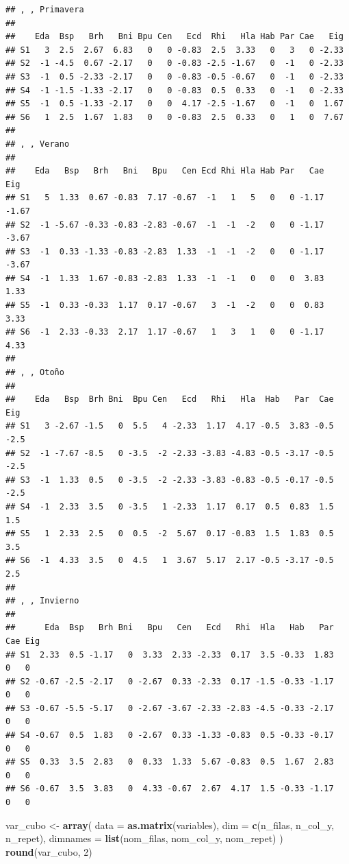 \documentclass[
  spanish,
]{article}
\newenvironment{Shaded}{\begin{snugshade}}{\end{snugshade}}
\newcommand{\DataTypeTok}[1]{\textcolor[rgb]{0.13,0.29,0.53}{#1}}
\newcommand{\DecValTok}[1]{\textcolor[rgb]{0.00,0.00,0.81}{#1}}
\newcommand{\KeywordTok}[1]{\textcolor[rgb]{0.13,0.29,0.53}{\textbf{#1}}}
\newcommand{\NormalTok}[1]{#1}
\newcommand{\StringTok}[1]{\textcolor[rgb]{0.31,0.60,0.02}{#1}}
\begin{document}
\begin{verbatim}
## , , Primavera
## 
##    Eda  Bsp   Brh   Bni Bpu Cen   Ecd  Rhi   Hla Hab Par Cae   Eig
## S1   3  2.5  2.67  6.83   0   0 -0.83  2.5  3.33   0   3   0 -2.33
## S2  -1 -4.5  0.67 -2.17   0   0 -0.83 -2.5 -1.67   0  -1   0 -2.33
## S3  -1  0.5 -2.33 -2.17   0   0 -0.83 -0.5 -0.67   0  -1   0 -2.33
## S4  -1 -1.5 -1.33 -2.17   0   0 -0.83  0.5  0.33   0  -1   0 -2.33
## S5  -1  0.5 -1.33 -2.17   0   0  4.17 -2.5 -1.67   0  -1   0  1.67
## S6   1  2.5  1.67  1.83   0   0 -0.83  2.5  0.33   0   1   0  7.67
## 
## , , Verano
## 
##    Eda   Bsp   Brh   Bni   Bpu   Cen Ecd Rhi Hla Hab Par   Cae   Eig
## S1   5  1.33  0.67 -0.83  7.17 -0.67  -1   1   5   0   0 -1.17 -1.67
## S2  -1 -5.67 -0.33 -0.83 -2.83 -0.67  -1  -1  -2   0   0 -1.17 -3.67
## S3  -1  0.33 -1.33 -0.83 -2.83  1.33  -1  -1  -2   0   0 -1.17 -3.67
## S4  -1  1.33  1.67 -0.83 -2.83  1.33  -1  -1   0   0   0  3.83  1.33
## S5  -1  0.33 -0.33  1.17  0.17 -0.67   3  -1  -2   0   0  0.83  3.33
## S6  -1  2.33 -0.33  2.17  1.17 -0.67   1   3   1   0   0 -1.17  4.33
## 
## , , Otoño
## 
##    Eda   Bsp  Brh Bni  Bpu Cen   Ecd   Rhi   Hla  Hab   Par  Cae  Eig
## S1   3 -2.67 -1.5   0  5.5   4 -2.33  1.17  4.17 -0.5  3.83 -0.5 -2.5
## S2  -1 -7.67 -8.5   0 -3.5  -2 -2.33 -3.83 -4.83 -0.5 -3.17 -0.5 -2.5
## S3  -1  1.33  0.5   0 -3.5  -2 -2.33 -3.83 -0.83 -0.5 -0.17 -0.5 -2.5
## S4  -1  2.33  3.5   0 -3.5   1 -2.33  1.17  0.17  0.5  0.83  1.5  1.5
## S5   1  2.33  2.5   0  0.5  -2  5.67  0.17 -0.83  1.5  1.83  0.5  3.5
## S6  -1  4.33  3.5   0  4.5   1  3.67  5.17  2.17 -0.5 -3.17 -0.5  2.5
## 
## , , Invierno
## 
##      Eda  Bsp   Brh Bni   Bpu   Cen   Ecd   Rhi  Hla   Hab   Par Cae Eig
## S1  2.33  0.5 -1.17   0  3.33  2.33 -2.33  0.17  3.5 -0.33  1.83   0   0
## S2 -0.67 -2.5 -2.17   0 -2.67  0.33 -2.33  0.17 -1.5 -0.33 -1.17   0   0
## S3 -0.67 -5.5 -5.17   0 -2.67 -3.67 -2.33 -2.83 -4.5 -0.33 -2.17   0   0
## S4 -0.67  0.5  1.83   0 -2.67  0.33 -1.33 -0.83  0.5 -0.33 -0.17   0   0
## S5  0.33  3.5  2.83   0  0.33  1.33  5.67 -0.83  0.5  1.67  2.83   0   0
## S6 -0.67  3.5  3.83   0  4.33 -0.67  2.67  4.17  1.5 -0.33 -1.17   0   0
\end{verbatim}

\begin{Shaded}
\begin{Highlighting}[]
\NormalTok{var\_cubo \textless{}{-}}\StringTok{ }\KeywordTok{array}\NormalTok{(}
  \DataTypeTok{data =} \KeywordTok{as.matrix}\NormalTok{(variables),}
  \DataTypeTok{dim =} \KeywordTok{c}\NormalTok{(n\_filas, n\_col\_y, n\_repet),}
  \DataTypeTok{dimnames =} \KeywordTok{list}\NormalTok{(nom\_filas, nom\_col\_y, nom\_repet)}
\NormalTok{)}
\KeywordTok{round}\NormalTok{(var\_cubo, }\DecValTok{2}\NormalTok{)}
\end{Highlighting}
\end{Shaded}
\end{document}
